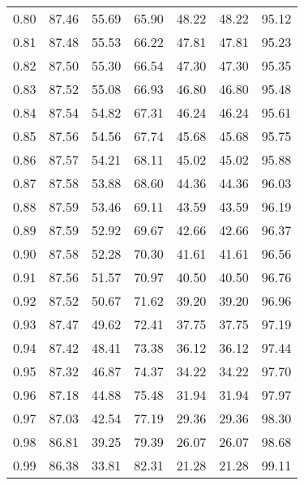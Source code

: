 \begin{tabular}{|c|c|c|c|c|c|c|}
      0.80 &     87.46 &     55.69 &      65.90 &   48.22 &      48.22 &         95.12 \\
      0.81 &     87.48 &     55.53 &      66.22 &   47.81 &      47.81 &         95.23 \\
      0.82 &     87.50 &     55.30 &      66.54 &   47.30 &      47.30 &         95.35 \\
      0.83 &     87.52 &     55.08 &      66.93 &   46.80 &      46.80 &         95.48 \\
      0.84 &     87.54 &     54.82 &      67.31 &   46.24 &      46.24 &         95.61 \\
      0.85 &     87.56 &     54.56 &      67.74 &   45.68 &      45.68 &         95.75 \\
      0.86 &     87.57 &     54.21 &      68.11 &   45.02 &      45.02 &         95.88 \\
      0.87 &     87.58 &     53.88 &      68.60 &   44.36 &      44.36 &         96.03 \\
      0.88 &     87.59 &     53.46 &      69.11 &   43.59 &      43.59 &         96.19 \\
      0.89 &     87.59 &     52.92 &      69.67 &   42.66 &      42.66 &         96.37 \\
      0.90 &     87.58 &     52.28 &      70.30 &   41.61 &      41.61 &         96.56 \\
      0.91 &     87.56 &     51.57 &      70.97 &   40.50 &      40.50 &         96.76 \\
      0.92 &     87.52 &     50.67 &      71.62 &   39.20 &      39.20 &         96.96 \\
      0.93 &     87.47 &     49.62 &      72.41 &   37.75 &      37.75 &         97.19 \\
      0.94 &     87.42 &     48.41 &      73.38 &   36.12 &      36.12 &         97.44 \\
      0.95 &     87.32 &     46.87 &      74.37 &   34.22 &      34.22 &         97.70 \\
      0.96 &     87.18 &     44.88 &      75.48 &   31.94 &      31.94 &         97.97 \\
      0.97 &     87.03 &     42.54 &      77.19 &   29.36 &      29.36 &         98.30 \\
      0.98 &     86.81 &     39.25 &      79.39 &   26.07 &      26.07 &         98.68 \\
      0.99 &     86.38 &     33.81 &      82.31 &   21.28 &      21.28 &         99.11 \\
\bottomrule
\end{tabular}
